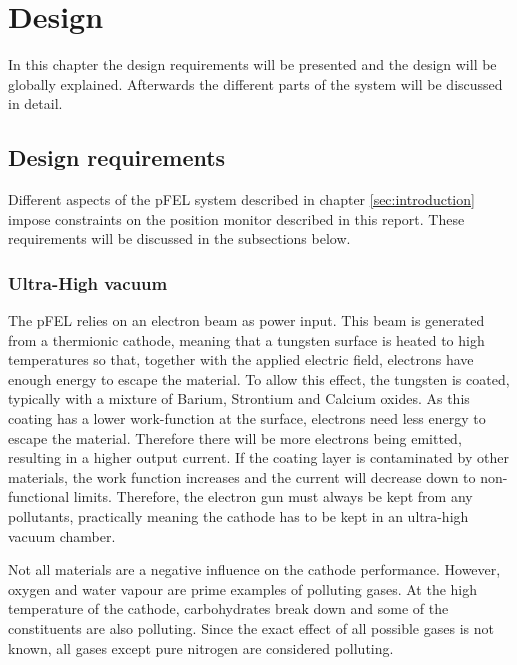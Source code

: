\chapter{Design}
\label{sec:design}
In this chapter the design requirements will be presented and the design will be globally explained. Afterwards the different parts of the system will be discussed in detail.

\section{Design requirements}
Different aspects of the pFEL system described in chapter \ref{sec:introduction} impose constraints on the position monitor described in this report. These requirements will be discussed in the subsections below.

\subsection{Ultra-High vacuum}
The pFEL relies on an electron beam as power input. This beam is generated from a thermionic cathode, meaning that a tungsten surface is heated to high temperatures so that, together with the applied electric field, electrons have enough energy to escape the material. To allow this effect, the tungsten is coated, typically with a mixture of Barium, Strontium and Calcium oxides. As this coating has a lower work-function at the surface, electrons need less energy to escape the material. Therefore there will be more electrons being emitted, resulting in a higher output current.
If the coating layer is contaminated by other materials, the work function increases and the current will decrease down to non-functional limits. Therefore, the electron gun must always be kept from any pollutants, practically meaning the cathode has to be kept in an ultra-high vacuum chamber.

Not all materials are a negative influence on the cathode performance. However, oxygen and water vapour are prime examples of polluting gases. At the high temperature of the cathode, carbohydrates break  down and some of the constituents are also polluting.
Since the exact effect of all possible gases is not known, all gases except pure nitrogen are considered polluting.

